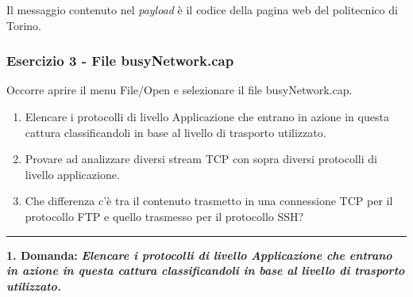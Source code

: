 \documentclass[a4paper]{article}
\newcommand{\longline}{\noindent\rule{\textwidth}{0.4pt}}
\begin{document}
	\noindent
	Il messaggio contenuto nel \emph{payload} è il codice della pagina web del politecnico di Torino.\newpage
	
	\subsubsection{Esercizio 3 - File \textsf{busyNetwork.cap}}
	
	Occorre aprire il menu \textsf{File/Open} e selezionare il file \textsf{busyNetwork.cap}.
	\begin{enumerate}
		\item Elencare i protocolli di livello Applicazione che entrano in azione in questa cattura classificandoli in base al livello di trasporto utilizzato.
		
		\item Provare ad analizzare diversi stream TCP con sopra diversi protocolli di livello applicazione.
		
		\item Che differenza c'è tra il contenuto trasmetto in una connessione TCP per il protocollo FTP e quello trasmesso per il protocollo SSH?
	\end{enumerate}
	
	\longline\newline
	
	\noindent
	\textcolor{Red3}{\textbf{1. Domanda:}} \textbf{\emph{Elencare i protocolli di livello Applicazione che entrano in azione in questa cattura classificandoli in base al livello di trasporto utilizzato.}}\newline
	
\end{document}
